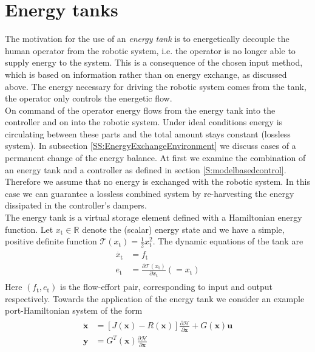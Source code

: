 \documentclass[a4paper,twoside, openright,12pt]{report}
\newcommand{\f}[1]{\boldsymbol{#1}}
\newcommand{\g}[1]{\text{#1}}
\begin{document}
\section{Energy tanks}\label{S:EnergyTanks}
The motivation for the use of an \emph{energy tank} is to energetically decouple the human operator from the robotic system, i.e. the operator is no longer able to supply energy to the system. This is a consequence of the chosen input method, which is based on information rather than on energy exchange, as discussed above. The energy necessary for driving the robotic system comes from the tank, the operator only controls the energetic flow.\\
On command of the operator energy flows from the energy tank into the controller and on into the robotic system. Under ideal conditions energy is circulating between these parts and the total amount stays constant (lossless system). In subsection \ref{SS:EnergyExchangeEnvironment} we discuss cases of a permanent change of the energy balance. At first we examine the combination of an energy tank and a controller as defined in section \ref{S:modelbasedcontrol}. Therefore we assume that no energy is exchanged with the robotic system. In this case we can guarantee a lossless combined system by re-harvesting the energy dissipated in the controller's dampers. \\ 
The energy tank is a virtual storage element defined with a Hamiltonian energy function. Let $x_\g{t} \in \mathbb{R}$ denote the (scalar) energy state and we have a simple, positive definite function $\mathcal{T}(x_\g{t}) = \frac{1}{2}x_\g{t}^2$. The dynamic equations of the tank are
\begin{eqnarray}
\begin{aligned}
\dot{x_\g{t}} &= f_\g{t} \\
e_\g{t} &= \frac{\partial \mathcal{T}(x_\g{t})}{\partial x_\g{t}} (=x_\g{t})
\end{aligned}
\end{eqnarray}
Here $(f_\g{t},e_\g{t})$ is the flow-effort pair, corresponding to input and output respectively. Towards the application of the energy tank we consider an example port-Hamiltonian system of the form
\begin{eqnarray}
\begin{aligned}
\dot{\f{x}} &= [J(\f{x}) - R(\f{x})] \frac{\partial \mathcal{H}}{\partial \f{x}} + G(\f{x})\f{u} \\
\f{y} &= G^T(\f{x}) \frac{\partial \mathcal{H}}{\partial \f{x}}
\end{aligned}
\end{eqnarray}
\end{document}
